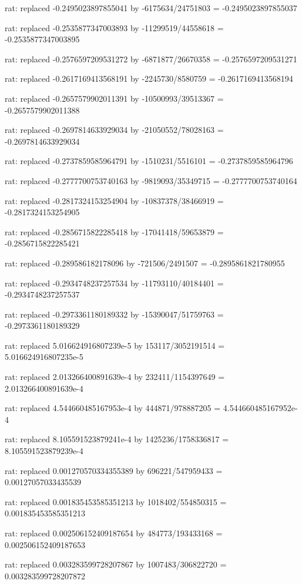 \documentclass[a4paper,10pt]{article}
\begin{document}
\begin{eulernotebook}
\begin{eulercomment}
\begin{eulercomment}
\begin{eulercomment}
\begin{eulercomment}
\begin{eulercomment}
\begin{eulercomment}
\begin{eulercomment}
\begin{eulercomment}
\begin{eulercomment}
\begin{eulercomment}
\begin{eulercomment}
\begin{eulercomment}
\begin{eulercomment}
\begin{eulercomment}
\begin{eulercomment}
\begin{eulercomment}
\begin{euleroutput}
  rat: replaced -0.2495023897855041 by -6175634/24751803 = -0.2495023897855037
  
  rat: replaced -0.2535877347003893 by -11299519/44558618 = -0.2535877347003895
  
  rat: replaced -0.2576597209531272 by -6871877/26670358 = -0.2576597209531271
  
  rat: replaced -0.2617169413568191 by -2245730/8580759 = -0.2617169413568194
  
  rat: replaced -0.2657579902011391 by -10500993/39513367 = -0.2657579902011388
  
  rat: replaced -0.2697814633929034 by -21050552/78028163 = -0.2697814633929034
  
  rat: replaced -0.2737859585964791 by -1510231/5516101 = -0.2737859585964796
  
  rat: replaced -0.2777700753740163 by -9819093/35349715 = -0.2777700753740164
  
  rat: replaced -0.2817324153254904 by -10837378/38466919 = -0.2817324153254905
  
  rat: replaced -0.2856715822285418 by -17041418/59653879 = -0.2856715822285421
  
  rat: replaced -0.289586182178096 by -721506/2491507 = -0.2895861821780955
  
  rat: replaced -0.2934748237257534 by -11793110/40184401 = -0.2934748237257537
  
  rat: replaced -0.2973361180189332 by -15390047/51759763 = -0.2973361180189329
  
  rat: replaced 5.016624916807239e-5 by 153117/3052191514 = 5.016624916807235e-5
  
  rat: replaced 2.013266400891639e-4 by 232411/1154397649 = 2.013266400891639e-4
  
  rat: replaced 4.544660485167953e-4 by 444871/978887205 = 4.544660485167952e-4
  
  rat: replaced 8.105591523879241e-4 by 1425236/1758336817 = 8.105591523879239e-4
  
  rat: replaced 0.001270570334355389 by 696221/547959433 = 0.00127057033435539
  
  rat: replaced 0.001835453585351213 by 1018402/554850315 = 0.001835453585351213
  
  rat: replaced 0.002506152409187654 by 484773/193433168 = 0.002506152409187653
  
  rat: replaced 0.003283599728207867 by 1007483/306822720 = 0.003283599728207872
  

\end{euleroutput}
\end{eulercomment}
\end{eulercomment}
\end{eulercomment}
\end{eulercomment}
\end{eulercomment}
\end{eulercomment}
\end{eulercomment}
\end{eulercomment}
\end{eulercomment}
\end{eulercomment}
\end{eulercomment}
\end{eulercomment}
\end{eulercomment}
\end{eulercomment}
\end{eulercomment}
\end{eulercomment}
\end{eulernotebook}
\end{document}
